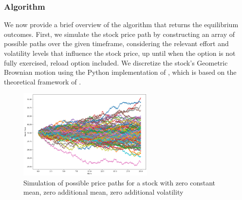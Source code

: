 \subsubsection*{Algorithm}
We now provide a brief overview of the algorithm that returns the equilibrium outcomes. First, we simulate the stock price path by constructing an array of possible paths over the given timeframe, considering the relevant effort and volatility levels that influence the stock price, up until when the option is not fully exercised, reload option included. We discretize the stock's Geometric Brownian motion using the Python implementation of \citet{qsbrownianpy}, which is based on the theoretical framework of \citet{glasserman2004monte}. 
\vspace*{15pt}
\begin{figure}[H]
    \centering
    \includegraphics[width=0.6\textwidth]{fig/5/sim_motion.png}
    \caption{Simulation of possible price paths for a stock with zero constant mean, zero additional mean, zero additional volatility}
    \label{fig:sim_motion}
\end{figure}
\vspace*{15pt}

